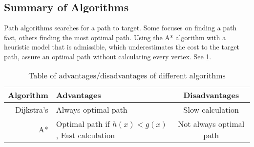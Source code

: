   \subsection{Summary of Algorithms}

  Path algorithms searches for a path to target. Some focuses on finding a path fast, others finding the most optimal path. Using the A* algorithm with a heuristic model that is admissible, which underestimates the cost to the target path, assure an optimal path without calculating every vertex. See \cref{tbl:scheme}. 
  
  \begin{table}[ht!]
    \centering
    \begin{tabular}{|r|l|c|}

      \hline
      \textbf{Algorithm} & \textbf{Advantages} & \textbf{Disadvantages} \\
      \hline
      Dijkstra's & Always optimal path & Slow calculation \\
      A* & Optimal path if $h(x)<g(x)$, Fast calculation & Not always optimal path \\
      \hline
    \end{tabular}
    \caption{Table of advantages/disadvantages of different algorithms}
    \label{tbl:scheme}
  \end{table}

